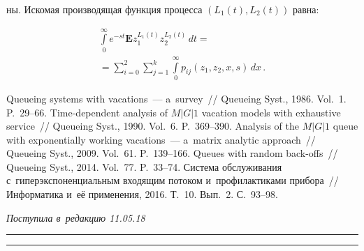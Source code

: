 \begin{multicols}{2}
\noindent
ны. Искомая производящая функция
процесса $(L_1(t),L_2(t))$ равна:

\noindent
\begin{multline*}
\int\limits_0^{\infty}e^{-st}\mathbf{E}
z_1^{L_1(t)} z_2^{L_2(t)}\,dt={}\\
{}=
\sum\limits_{i=0}^2\sum\limits_{j=1}^k\int\limits_0^{\infty}p_{ij}
\left(z_1,z_2,x,s\right)\,dx\,.
\end{multline*}

\vspace*{-18pt}

{\small\frenchspacing
 {%
 \begin{thebibliography}{9}
 Queueing systems with vacations~--- a~survey~// 
Queueing Syst., 1986. Vol.~1.  P.~29--66.
 Time-dependent analysis of $M\vert G\vert 1$ vacation models 
with exhaustive service~// Queueing Syst.,
1990. Vol.~6.  P.~369--390.
Analysis of the $M\vert G\vert 1$ queue with exponentially working vacations~--- 
a~matrix analytic approach~// Queueing Syst., 2009. Vol.~61.
P.~139--166.
Queues with random back-offs~// Queueing Syst.,
2014. Vol.~77. P.~33--74.
 Система обслуживания с~гиперэкспоненциальным входящим потоком 
и~профилактиками прибора~// Информатика и~её применения, 2016. Т.~10. 
Вып.~2. С.~93--98.
 \end{thebibliography}

 }
 }

\end{multicols}

\vspace*{-9pt}

\hfill{\small\textit{Поступила в~редакцию 11.05.18}}

\vspace*{6pt}




\hrule

\vspace*{2pt}

\hrule


